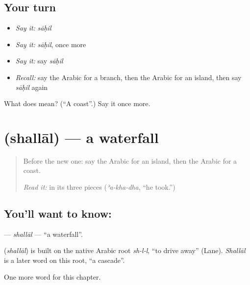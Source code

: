 \subsection*{Your turn}
\begin{itemize}
\raggedright
  \item \emph{Say it:} \emph{sāḥil}
  \item \emph{Say it:} \emph{sāḥil}, once more
  \item \emph{Say it:} say \emph{sāḥil}
  \item \emph{Recall:} say the Arabic for a branch, then the Arabic for an island, then say \emph{sāḥil} again
\end{itemize}

\begin{tcolorbox}[breakable,colback=teal!4,colframe=teal!35!black,title={Before you move on}]
What does  mean? (\textquotedblleft{}A coast\textquotedblright{}.) Say it once more.
\end{tcolorbox}
\section[\texorpdfstring{\ar{شلال} (shallāl)}{شلال (shallāl)}]{ (shallāl) — a waterfall}

\label{lesson:AR-C132-shallal}



\begin{quote}
Before the new one: say the Arabic for an island, then the Arabic for a coast.

\emph{Read it:} \textbf{} in its three pieces (\emph{ʾa-kha-dha}, \textquotedblleft{}he took.\textquotedblright{})
\end{quote}

\subsection*{You'll want to know: }
\textbf{} — \emph{shallāl} — \textquotedblleft{}a waterfall\textquotedblright{}.

\begin{cousinweb}
\textbf{} (\emph{shallāl}) is built on the native Arabic root \emph{sh-l-l}, \textquotedblleft{}to drive away\textquotedblright{} (Lane). \emph{Shallāl} is a later word on this root, \textquotedblleft{}a cascade\textquotedblright{}.
\end{cousinweb}

\begin{grammarlens}[title={What you've built}]
One more word for this chapter.
\end{grammarlens}

